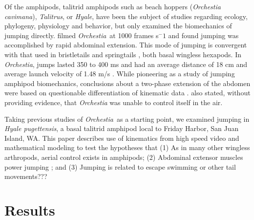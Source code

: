 \documentclass{article}
\newcommand{\Genus}[1]{\emph{#1}}
\newcommand{\Hyalepugettensis}{\Genus{Hyale pugettensis}}
\begin{document}
Of the amphipods, talitrid amphipods such as beach hoppers (\Genus{Orchestia cavimana}), \Genus{Talitrus}, or \Genus{Hyale}, have been the subject of studies regarding ecology, phylogeny, physiology and behavior, but only \citet{Bracht:1980} examined the biomechanics of jumping directly.  \citet{Bracht:1980} filmed \Genus{Orchestia}\ at 1000 frames s$^-1$ and found jumping was accomplished by rapid abdominal extension.  This mode of jumping is convergent with that used in bristletails \citep{Evans:1975} and springtails \citep{Christian:1978}, both basal wingless hexapods.  In \Genus{Orchestia}, jumps lasted 350 to 400 ms and had an average distance of 18 cm and average launch velocity of 1.48 m/s \citep{Bracht:1980}.  While pioneering as a study of jumping amphipod biomechanics, conclusions about a two-phase extension of the abdomen were based on questionable differentiation of kinematic data \citep{Crenshaw:2000}.  \citet{Bracht:1980} also stated, without providing evidence, that \Genus{Orchestia} was unable to control itself in the air.  
	
Taking previous studies of \Genus{Orchestia}~as a starting point, we examined jumping in \Hyalepugettensis, a basal talitrid amphipod local to Friday Harbor, San Juan Island, WA.  This paper describes use of kinematics from high speed video and mathematical modeling to test the hypotheses that (1) As in many other wingless arthropods, aerial control exists in amphipods; (2) Abdominal extensor muscles power jumping \citep{Bracht:1980}; and (3) Jumping is related to escape swimming or other tail movements??? 






 

\section*{Results}
\end{document}
